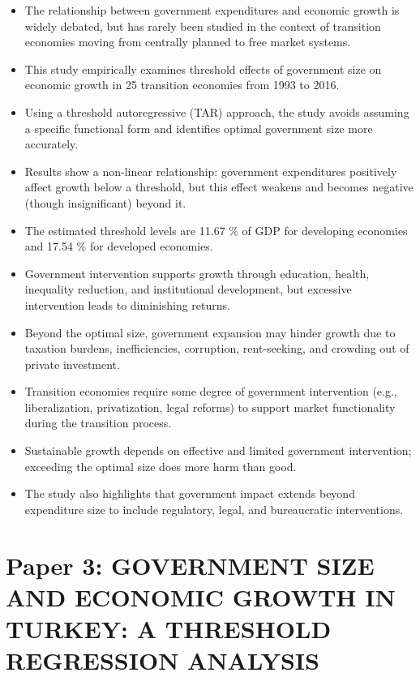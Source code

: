 \documentclass[10pt, oneside]{article}
\begin{document}
\begin{itemize}
	\item The relationship between government expenditures and economic growth is widely debated, but has rarely been studied in the context of transition economies moving from centrally planned to free market systems.
	\item This study empirically examines threshold effects of government size on economic growth in 25 transition economies from 1993 to 2016.
	\item Using a threshold autoregressive (TAR) approach, the study avoids assuming a specific functional form and identifies optimal government size more accurately.
	\item Results show a non-linear relationship: government expenditures positively affect growth below a threshold, but this effect weakens and becomes negative (though insignificant) beyond it.
	\item The estimated threshold levels are 11.67 \% of GDP for developing economies and 17.54 \% for developed economies.
	\item Government intervention supports growth through education, health, inequality reduction, and institutional development, but excessive intervention leads to diminishing returns.
	\item Beyond the optimal size, government expansion may hinder growth due to taxation burdens, inefficiencies, corruption, rent-seeking, and crowding out of private investment.
	\item Transition economies require some degree of government intervention (e.g., liberalization, privatization, legal reforms) to support market functionality during the transition process.
	\item Sustainable growth depends on effective and limited government intervention; exceeding the optimal size does more harm than good.
	\item The study also highlights that government impact extends beyond expenditure size to include regulatory, legal, and bureaucratic interventions.
\end{itemize}

\section{Paper 3: GOVERNMENT SIZE AND ECONOMIC GROWTH IN TURKEY: A THRESHOLD REGRESSION ANALYSIS}
\end{document}
